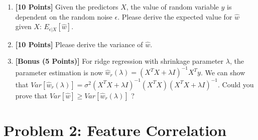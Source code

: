 \documentclass{article}
\begin{document}
\begin{enumerate}
\item {\bf [10 Points]} Given the predictors $X$, the value of random variable $y$ is dependent on the random noise $\epsilon$. Please derive the expected value for $\hat{w}$ given $X$: $E_{\epsilon|X} [\hat{w}]$. 

\item {\bf [10 Points]} Please derive the variance of $\hat{w}$. 

\item {\bf [Bonus (5 Points)]} For ridge regression with shrinkage parameter $\lambda$, the parameter estimation is now $\hat{w}_{r} (\lambda) = (X^TX+\lambda I)^{-1}X^Ty$. We can show that $Var[\hat{w}_{r} (\lambda)] =\sigma^2 (X^TX+\lambda I)^{-1} (X^TX) (X^TX+\lambda I)^{-1}$. Could you prove that $ Var[\hat{w}] \geq  Var[\hat{w}_{r} (\lambda)]$ ? 

\end{enumerate}



\section*{Problem 2: Feature Correlation}
\end{document}
